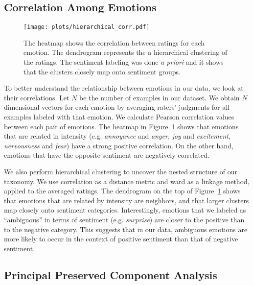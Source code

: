 \documentclass[11pt,a4paper]{article}
\begin{document}
\subsection{Correlation Among Emotions}
\begin{figure}[t!]
\centering
   \texttt{[image: plots/hierarchical\_corr.pdf]}
   \caption{The heatmap shows the correlation between ratings for each emotion. The dendrogram represents the a hierarchical clustering of the ratings. The sentiment labeling was done \emph{a priori} and it shows that the clusters closely map onto sentiment groups. }
   \label{fig:hierarchical_corr}
\end{figure}


To better understand the relationship between emotions in our data, we look at their correlations. Let $N$ be the number of examples in our dataset. We obtain $N$ dimensional vectors for each emotion by averaging raters' judgments for all examples labeled with that emotion. We calculate Pearson correlation values between each pair of emotions.  The heatmap in Figure~\ref{fig:hierarchical_corr} shows that emotions that are related in intensity (e.g. \emph{annoyance} and \emph{anger}, \emph{joy} and \emph{excitement}, \emph{nervousness} and \emph{fear}) have a strong positive correlation. On the other hand, emotions that have the opposite sentiment are negatively correlated.

We also perform hierarchical clustering to uncover the nested structure of our taxonomy. We use correlation as a distance metric and ward as a linkage method, applied to the averaged ratings. The dendrogram on the top of  Figure~\ref{fig:hierarchical_corr} shows that emotions that are related by intensity are neighbors, and that larger clusters map closely onto sentiment categories. Interestingly, emotions that we labeled as ``ambiguous'' in terms of sentiment (e.g. \emph{surprise}) are closer to the positive than to the negative category. This suggests that in our data, ambiguous emotions are more likely to occur in the context of positive sentiment than that of negative sentiment.


\subsection{Principal Preserved Component Analysis}
\label{ssec:ppca}
\end{document}
